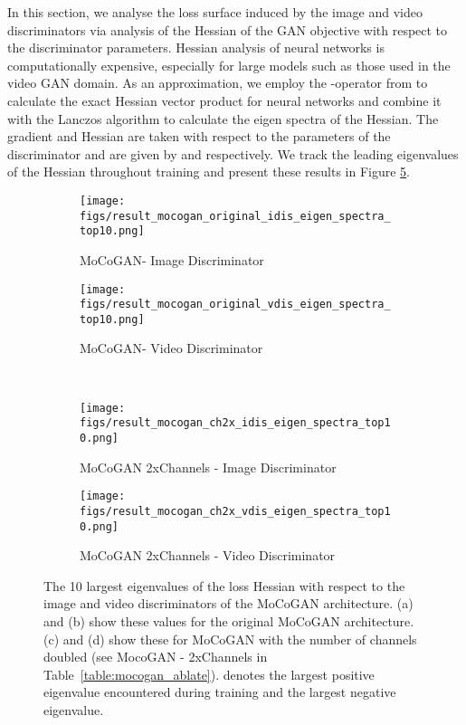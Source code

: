 \documentclass[a4paper,fleqn]{cas-sc}
\begin{document}
In this section, we analyse the loss surface induced by the image and video discriminators via analysis of the Hessian of the
GAN objective with respect to the discriminator parameters. Hessian analysis of neural networks is computationally expensive, especially for large models such as those used in the video GAN domain. As an approximation, we employ the -operator from \citet{Pearlmutter94hess} to calculate the exact Hessian vector product for neural networks and combine it with the Lanczos algorithm to calculate the eigen spectra of the Hessian. The gradient and Hessian are taken with respect to the parameters of the discriminator and are given by
 and  respectively. We track the leading eigenvalues of the Hessian throughout training and present these results in Figure \ref{fig:MoCoGAN_Dis_EV}. 



\begin{figure}[pos=!th]
    \centering
    \begin{subfigure}[t]{0.5\textwidth}
        \centering
        \texttt{[image: figs/result\_mocogan\_original\_idis\_eigen\_spectra\_top10.png]}
        \caption{MoCoGAN- Image Discriminator}
        \label{fig:MoCoGAN_iDis_EV}
    \end{subfigure}\begin{subfigure}[t]{0.5\textwidth}
        \centering
        \texttt{[image: figs/result\_mocogan\_original\_vdis\_eigen\_spectra\_top10.png]}
        \caption{MoCoGAN- Video
        Discriminator}
        \label{fig:MoCoGAN_vDis_EV}
    \end{subfigure}\\
    \begin{subfigure}[t]{0.5\textwidth}
        \centering
        \texttt{[image: figs/result\_mocogan\_ch2x\_idis\_eigen\_spectra\_top10.png]}
        \caption{MoCoGAN 2xChannels - Image Discriminator}
        \label{fig:MoCoGAN_iDis_2xCh_EV}
    \end{subfigure}\begin{subfigure}[t]{0.5\textwidth}
        \centering
        \texttt{[image: figs/result\_mocogan\_ch2x\_vdis\_eigen\_spectra\_top10.png]}
        \caption{MoCoGAN 2xChannels - Video Discriminator}
        \label{fig:MoCoGAN_vDis_2xCh_EV}
    \end{subfigure}
\caption{The 10 largest eigenvalues of the loss Hessian with respect to the image and video discriminators of the MoCoGAN architecture. (a) and (b) show these values for the original MoCoGAN architecture. (c) and (d) show these for MoCoGAN with the number of channels doubled (see MocoGAN - 2xChannels in Table~\ref{table:mocogan_ablate}).  denotes the largest positive eigenvalue encountered during training and  the largest negative eigenvalue.} 
    \label{fig:MoCoGAN_Dis_EV}
\end{figure}
\end{document}
